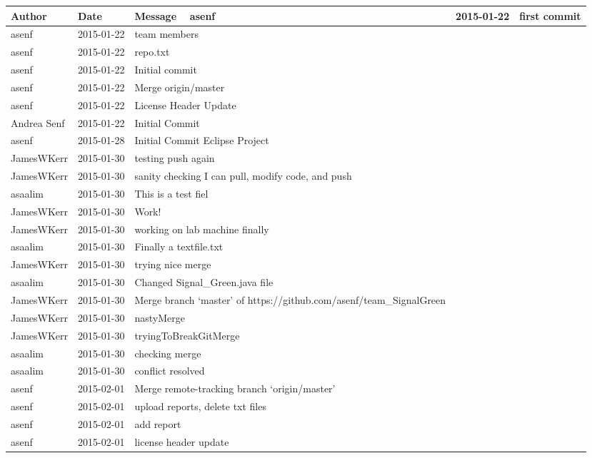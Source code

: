 \begin{center}
\begin{longtabu} to \textwidth {|
X[4,l]|
X[3,c]|
X[8,l]|}
\hline
\textbf{Author} & \textbf{Date} & \textbf{Message} \ \hline
asenf & 2015-01-22 & first commit \\ \hline
asenf & 2015-01-22 & team members \\ \hline
asenf & 2015-01-22 & repo.txt \\ \hline
asenf & 2015-01-22 & Initial commit \\ \hline
asenf & 2015-01-22 & Merge origin/master \\ \hline
asenf & 2015-01-22 & License Header Update \\ \hline
Andrea Senf & 2015-01-22 & Initial Commit \\ \hline
asenf & 2015-01-28 & Initial Commit Eclipse Project \\ \hline
JamesWKerr & 2015-01-30 & testing push again \\ \hline
JamesWKerr & 2015-01-30 & sanity checking I can pull, modify code, and push \\ \hline
asaalim & 2015-01-30 & This is a test fiel \\ \hline
JamesWKerr & 2015-01-30 & Work! \\ \hline
JamesWKerr & 2015-01-30 & working on lab machine finally \\ \hline
asaalim & 2015-01-30 & Finally a textfile.txt \\ \hline
JamesWKerr & 2015-01-30 & trying nice merge \\ \hline
asaalim & 2015-01-30 & Changed Signal\_Green.java file \\ \hline
JamesWKerr & 2015-01-30 & Merge branch `master' of https://github.com/asenf/team\_SignalGreen \\ \hline
JamesWKerr & 2015-01-30 & nastyMerge \\ \hline
JamesWKerr & 2015-01-30 & tryingToBreakGitMerge \\ \hline
asaalim & 2015-01-30 & checking merge \\ \hline
asaalim & 2015-01-30 & conflict resolved \\ \hline
asenf & 2015-02-01 & Merge remote-tracking branch `origin/master' \\ \hline
asenf & 2015-02-01 & upload reports, delete txt files \\ \hline
asenf & 2015-02-01 & add report \\ \hline
asenf & 2015-02-01 & license header update \\ \hline

\end{longtabu}
\end{center}
